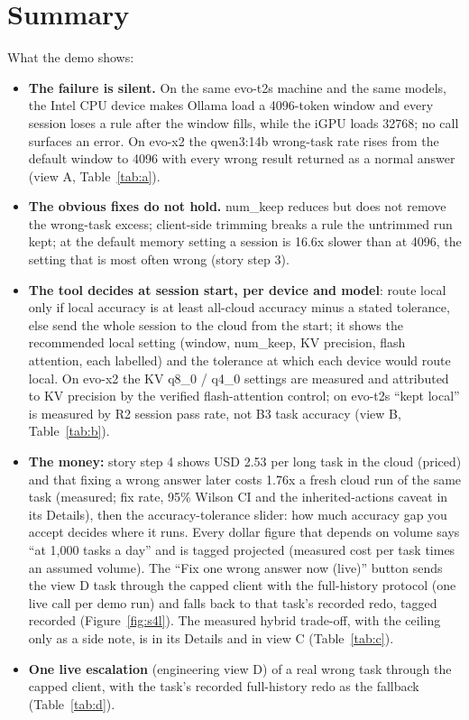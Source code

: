 \documentclass[11pt]{article}
\begin{document}
\section{Summary}
What the demo shows:
\begin{itemize}
\item \textbf{The failure is silent.} On the same evo-t2s machine and the same models, the Intel CPU device makes
  Ollama load a 4096-token window and every session loses a rule after the window fills, while the iGPU loads 32768;
  no call surfaces an error. On evo-x2 the qwen3:14b wrong-task rate rises from the default window to 4096 with every
  wrong result returned as a normal answer (view A, Table~\ref{tab:a}).
\item \textbf{The obvious fixes do not hold.} num\_keep reduces but does not remove the wrong-task excess; client-side
  trimming breaks a rule the untrimmed run kept; at the default memory setting a session is 16.6x slower than at
  4096, the setting that is most often wrong (story step 3).
\item \textbf{The tool decides at session start, per device and model}: route local only if local accuracy is at least
  all-cloud accuracy minus a stated tolerance, else send the whole session to the cloud from the start; it shows the
  recommended local setting (window, num\_keep, KV precision, flash attention, each labelled) and the tolerance at
  which each device would route local. On evo-x2 the KV q8\_0 / q4\_0 settings are measured and attributed to KV precision by the verified
  flash-attention control; on evo-t2s ``kept local'' is measured by R2 session pass rate, not B3 task accuracy
  (view B, Table~\ref{tab:b}).
\item \textbf{The money:} story step 4 shows USD 2.53 per long task in the cloud (priced) and that fixing a wrong
  answer later costs 1.76x a fresh cloud run of the same task (measured; fix rate, 95\% Wilson CI and the
  inherited-actions caveat in its Details), then the
  accuracy-tolerance slider: how much accuracy gap you accept decides where it runs. Every dollar figure that depends
  on volume says ``at 1,000 tasks a day'' and is tagged projected (measured cost per task times an assumed volume).
  The ``Fix one wrong answer now (live)'' button sends the view D task through the capped client with the
  full-history protocol (one live call per demo run) and falls back to that task's recorded redo, tagged recorded
  (Figure~\ref{fig:s4l}). The measured hybrid trade-off,
  with the ceiling only as a side note, is in its Details and in view C (Table~\ref{tab:c}).
\item \textbf{One live escalation} (engineering view D) of a real wrong task through the capped client, with the
  task's recorded full-history redo as the fallback (Table~\ref{tab:d}).
\end{itemize}
\end{document}

